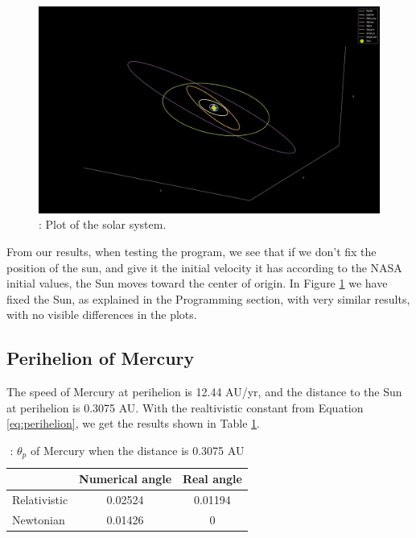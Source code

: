 \documentclass{article}
\begin{document}
            \begin{figure}[H]
                \begin{center}
                    \includegraphics[width=1.2\textwidth]{./Plot/Solar_System.png}
                    \caption{: Plot of the solar system.}
                    \label{fig:solar}
                \end{center}
            \end{figure}

            From our results, when testing the program, we see that if we don't fix the position of the sun, and give it the initial velocity it has according to the NASA initial values, the Sun moves toward the center of origin. In Figure \ref{fig:solar} we have fixed the Sun, as explained in the Programming section, with very similar results, with no visible differences in the plots.

        \subsection{Perihelion of Mercury}
            The speed of Mercury at perihelion is 12.44 AU/yr, and the distance to the Sun at perihelion is 0.3075 AU. With the realtivistic constant from Equation \ref{eq:perihelion}, we get the results shown in Table \ref{tab:perihelion}.

            \begin{table}[h!]
                \caption{: $\theta_p$ of Mercury when the distance is 0.3075 AU}
                \label{tab:perihelion}
                \centering
                \begin{tabular}{l c c}

                          & Numerical angle & Real angle\\
                    \hline
                    Relativistic    & 0.02524 & 0.01194 \\
                    Newtonian   & 0.01426  &  0 \\
                    \hline
                \end{tabular}
            \end{table}
\end{document}
